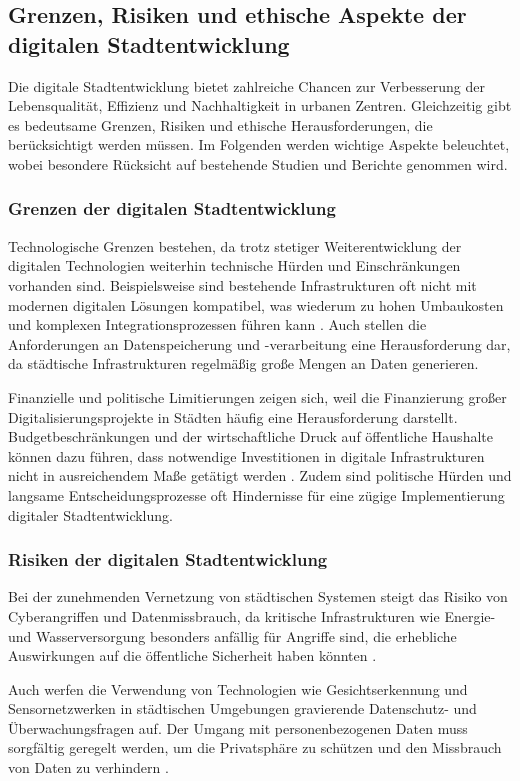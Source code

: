 \documentclass[conference,compsoc,final,a4paper, onecolumn, 11pt]{IEEEtran}
\begin{document}
\subsection{Grenzen, Risiken und ethische Aspekte der digitalen Stadtentwicklung}
Die digitale Stadtentwicklung bietet zahlreiche Chancen zur Verbesserung der Lebensqualität, Effizienz und Nachhaltigkeit in urbanen Zentren. 
Gleichzeitig gibt es bedeutsame Grenzen, Risiken und ethische Herausforderungen, die berücksichtigt werden müssen. 
Im Folgenden werden wichtige Aspekte beleuchtet, wobei besondere Rücksicht auf bestehende Studien und Berichte genommen wird.

\subsubsection{Grenzen der digitalen Stadtentwicklung}
Technologische Grenzen bestehen, da trotz stetiger Weiterentwicklung der digitalen Technologien weiterhin technische Hürden und Einschränkungen vorhanden sind. 
Beispielsweise sind bestehende Infrastrukturen oft nicht mit modernen digitalen Lösungen kompatibel, was wiederum zu hohen Umbaukosten und komplexen Integrationsprozessen führen kann \autocite{Dodge2020}. 
Auch stellen die Anforderungen an Datenspeicherung und -verarbeitung eine Herausforderung dar, da städtische Infrastrukturen regelmäßig große Mengen an Daten generieren.

Finanzielle und politische Limitierungen zeigen sich, weil die Finanzierung großer Digitalisierungsprojekte in Städten häufig eine Herausforderung darstellt. 
Budgetbeschränkungen und der wirtschaftliche Druck auf öffentliche Haushalte können dazu führen, dass notwendige Investitionen in digitale Infrastrukturen nicht in ausreichendem Maße getätigt werden \autocite{WorldBank2018}. 
Zudem sind politische Hürden und langsame Entscheidungsprozesse oft Hindernisse für eine zügige Implementierung digitaler Stadtentwicklung.

\subsubsection{Risiken der digitalen Stadtentwicklung}
Bei der zunehmenden Vernetzung von städtischen Systemen steigt das Risiko von Cyberangriffen und Datenmissbrauch, da kritische Infrastrukturen wie Energie- und Wasserversorgung besonders anfällig für Angriffe sind, die erhebliche Auswirkungen auf die öffentliche Sicherheit haben könnten \autocite{ENISA2019}.

Auch werfen die Verwendung von Technologien wie Gesichtserkennung und Sensornetzwerken in städtischen Umgebungen gravierende Datenschutz- und Überwachungsfragen auf. 
Der Umgang mit personenbezogenen Daten muss sorgfältig geregelt werden, um die Privatsphäre zu schützen und den Missbrauch von Daten zu verhindern \autocite{Zuboff2019}.
\end{document}
